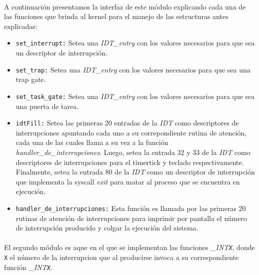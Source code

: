 \documentclass[11pt, a4paper]{article}
\begin{document}
	\paragraph{}
	A continuación presentamos la interfaz de este módulo explicando cada una de las funciones que brinda al kernel para el manejo de las estructuras antes explicadas:
	\begin{itemize}
		\item \texttt{set\_interrupt:} Setea una \textit{IDT\_entry} con los valores necesarios para que sea un descriptor de interrupción.
		\item \texttt{set\_trap:} Setea una \textit{IDT\_entry} con los valores necesarios para que sea una trap gate.
		\item \texttt{set\_task\_gate:}  Setea una \textit{IDT\_entry} con los valores necesarios para que sea una puerta de tarea.
		\item \texttt{idtFill:} Setea las primeras 20 entradas de la \textit{IDT} como descriptores de interrupciones apuntando cada uno a su correpondiente rutina de atención, cada una de las cuales llama a su vez a la función \textit{handler\_de\_interrupciones}.	Luego, setea la entrada 32 y 33 de la \textit{IDT} como descriptores de interrupciones para el timertick y teclado respectivamente. Finalmente, setea la entrada 80 de la \textit{IDT} como un descriptor de interrupción que implementa la syscall \textit{exit} para matar al proceso que se encuentra en ejecución.
		\item \texttt{handler\_de\_interrupciones:} Esta función es llamada por las primeras 20 rutinas de atención de interrupciones para imprimir por pantalla el número de interrupción producido y colgar la ejecución del sistema.
	\end{itemize}
	
	\paragraph{}
	El segundo módulo es aque en el que se implementan las funciones \textit{\_INT\texttt{X}}, donde \texttt{X} el número de la interrupcion que al producirse invoca a su correspondiente función \textit{\_INT\texttt{X}}.
	
\end{document}
